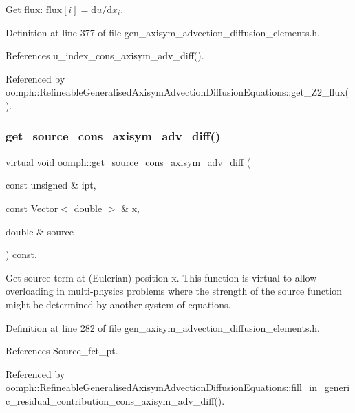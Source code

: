 Get flux\+: $\mbox{flux}[i] = \mbox{d}u / \mbox{d}x_i $. 



Definition at line 377 of file gen\+\_\+axisym\+\_\+advection\+\_\+diffusion\+\_\+elements.\+h.



References u\+\_\+index\+\_\+cons\+\_\+axisym\+\_\+adv\+\_\+diff().



Referenced by oomph\+::\+Refineable\+Generalised\+Axisym\+Advection\+Diffusion\+Equations\+::get\+\_\+\+Z2\+\_\+flux().

\mbox{\label{namespaceoomph_aa0cdf7be6b3844c558f937572c4dfb5c}} 
\subsubsection{\texorpdfstring{get\+\_\+source\+\_\+cons\+\_\+axisym\+\_\+adv\+\_\+diff()}{get\_source\_cons\_axisym\_adv\_diff()}}
{\footnotesize\ttfamily virtual void oomph\+::get\+\_\+source\+\_\+cons\+\_\+axisym\+\_\+adv\+\_\+diff (\begin{DoxyParamCaption}\item[{const unsigned \&}]{ipt,  }\item[{const \hyperlink{classoomph_1_1Vector}{Vector}$<$ double $>$ \&}]{x,  }\item[{double \&}]{source }\end{DoxyParamCaption}) const\hspace{0.3cm}{\ttfamily [inline]}, {\ttfamily [virtual]}}



Get source term at (Eulerian) position x. This function is virtual to allow overloading in multi-\/physics problems where the strength of the source function might be determined by another system of equations. 



Definition at line 282 of file gen\+\_\+axisym\+\_\+advection\+\_\+diffusion\+\_\+elements.\+h.



References Source\+\_\+fct\+\_\+pt.



Referenced by oomph\+::\+Refineable\+Generalised\+Axisym\+Advection\+Diffusion\+Equations\+::fill\+\_\+in\+\_\+generic\+\_\+residual\+\_\+contribution\+\_\+cons\+\_\+axisym\+\_\+adv\+\_\+diff().

